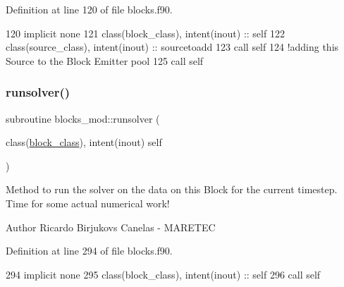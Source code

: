 Definition at line 120 of file blocks.\+f90.


\begin{DoxyCode}
120     \textcolor{keywordtype}{implicit none}
121     \textcolor{keywordtype}{class}(block\_class), \textcolor{keywordtype}{intent(inout)} :: self
122     \textcolor{keywordtype}{class}(source\_class), \textcolor{keywordtype}{intent(inout)} :: sourcetoadd
123     \textcolor{keyword}{call }self%
124     \textcolor{comment}{!adding this Source to the Block Emitter pool}
125     \textcolor{keyword}{call }self%
\end{DoxyCode}
\mbox{\label{namespaceblocks__mod_a3245bdadbec6bb123c517921d1503b48}} 
\subsubsection{\texorpdfstring{runsolver()}{runsolver()}}
{\footnotesize\ttfamily subroutine blocks\+\_\+mod\+::runsolver (\begin{DoxyParamCaption}\item[{class(\mbox{\hyperlink{structblocks__mod_1_1block__class}{block\+\_\+class}}), intent(inout)}]{self }\end{DoxyParamCaption})\hspace{0.3cm}{\ttfamily [private]}}



Method to run the solver on the data on this Block for the current timestep. Time for some actual numerical work! 

\begin{DoxyAuthor}{Author}
Ricardo Birjukovs Canelas -\/ M\+A\+R\+E\+T\+EC 
\end{DoxyAuthor}


Definition at line 294 of file blocks.\+f90.


\begin{DoxyCode}
294     \textcolor{keywordtype}{implicit none}
295     \textcolor{keywordtype}{class}(block\_class), \textcolor{keywordtype}{intent(inout)} :: self
296     \textcolor{keyword}{call }self%
\end{DoxyCode}
\mbox{\label{namespaceblocks__mod_a5a9992de40470e417ec8e40e688f6a0e}} 
